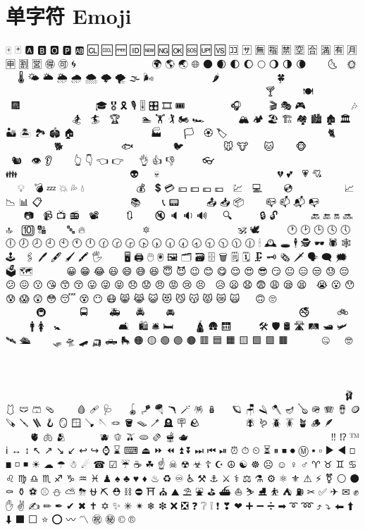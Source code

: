 \documentclass{article}
\begin{document}
\section{单字符 Emoji}

🀄 🃏 🅰 🅱 🅾 🅿 🆎 🆑 🆒 🆓 🆔 🆕 🆖 🆗 🆘 🆙 🆚 🈁 🈂 🈚 🈯 🈲 🈳 🈴 🈵 🈶 🈷 🈸 🈹 🈺 🉐 🉑 🌀 🌁 🌂 🌃 🌄 🌅 🌆 🌇 🌈 🌉 🌊 🌋 🌌 🌍 🌎 🌏 🌐 🌑 🌒 🌓 🌔 🌕 🌖 🌗 🌘 🌙 🌚 🌛 🌜 🌝 🌞 🌟 🌠 🌡 🌤 🌥 🌦 🌧 🌨 🌩 🌪 🌫 🌬 🌭 🌮 🌯 🌰 🌱 🌲 🌳 🌴 🌵 🌶 🌷 🌸 🌹 🌺 🌻 🌼 🌽 🌾 🌿 🍀 🍁 🍂 🍃 🍄 🍅 🍆 🍇 🍈 🍉 🍊 🍋 🍌 🍍 🍎 🍏 🍐 🍑 🍒 🍓 🍔 🍕 🍖 🍗 🍘 🍙 🍚 🍛 🍜 🍝 🍞 🍟 🍠 🍡 🍢 🍣 🍤 🍥 🍦 🍧 🍨 🍩 🍪 🍫 🍬 🍭 🍮 🍯 🍰 🍱 🍲 🍳 🍴 🍵 🍶 🍷 🍸 🍹 🍺 🍻 🍼 🍽 🍾 🍿 🎀 🎁 🎂 🎃 🎄 🎅 🎆 🎇 🎈 🎉 🎊 🎋 🎌 🎍 🎎 🎏 🎐 🎑 🎒 🎓 🎖 🎗 🎙 🎚 🎛 🎞 🎟 🎠 🎡 🎢 🎣 🎤 🎥 🎦 🎧 🎨 🎩 🎪 🎫 🎬 🎭 🎮 🎯 🎰 🎱 🎲 🎳 🎴 🎵 🎶 🎷 🎸 🎹 🎺 🎻 🎼 🎽 🎾 🎿 🏀 🏁 🏂 🏃 🏄 🏅 🏆 🏇 🏈 🏉 🏊 🏋 🏌 🏍 🏎 🏏 🏐 🏑 🏒 🏓 🏔 🏕 🏖 🏗 🏘 🏙 🏚 🏛 🏜 🏝 🏞 🏟 🏠 🏡 🏢 🏣 🏤 🏥 🏦 🏧 🏨 🏩 🏪 🏫 🏬 🏭 🏮 🏯 🏰 🏳 🏴 🏵 🏷 🏸 🏹 🏺 🏻 🏼 🏽 🏾 🏿 🐀 🐁 🐂 🐃 🐄 🐅 🐆 🐇 🐈 🐉 🐊 🐋 🐌 🐍 🐎 🐏 🐐 🐑 🐒 🐓 🐔 🐕 🐖 🐗 🐘 🐙 🐚 🐛 🐜 🐝 🐞 🐟 🐠 🐡 🐢 🐣 🐤 🐥 🐦 🐧 🐨 🐩 🐪 🐫 🐬 🐭 🐮 🐯 🐰 🐱 🐲 🐳 🐴 🐵 🐶 🐷 🐸 🐹 🐺 🐻 🐼 🐽 🐾 🐿 👀 👁 👂 👃 👄 👅 👆 👇 👈 👉 👊 👋 👌 👍 👎 👏 👐 👑 👒 👓 👔 👕 👖 👗 👘 👙 👚 👛 👜 👝 👞 👟 👠 👡 👢 👣 👤 👥 👦 👧 👨 👩 👪 👫 👬 👭 👮 👯 👰 👱 👲 👳 👴 👵 👶 👷 👸 👹 👺 👻 👼 👽 👾 👿 💀 💁 💂 💃 💄 💅 💆 💇 💈 💉 💊 💋 💌 💍 💎 💏 💐 💑 💒 💓 💔 💕 💖 💗 💘 💙 💚 💛 💜 💝 💞 💟 💠 💡 💢 💣 💤 💥 💦 💧 💨 💩 💪 💫 💬 💭 💮 💯 💰 💱 💲 💳 💴 💵 💶 💷 💸 💹 💺 💻 💼 💽 💾 💿 📀 📁 📂 📃 📄 📅 📆 📇 📈 📉 📊 📋 📌 📍 📎 📏 📐 📑 📒 📓 📔 📕 📖 📗 📘 📙 📚 📛 📜 📝 📞 📟 📠 📡 📢 📣 📤 📥 📦 📧 📨 📩 📪 📫 📬 📭 📮 📯 📰 📱 📲 📳 📴 📵 📶 📷 📸 📹 📺 📻 📼 📽 📿 🔀 🔁 🔂 🔃 🔄 🔅 🔆 🔇 🔈 🔉 🔊 🔋 🔌 🔍 🔎 🔏 🔐 🔑 🔒 🔓 🔔 🔕 🔖 🔗 🔘 🔙 🔚 🔛 🔜 🔝 🔞 🔟 🔠 🔡 🔢 🔣 🔤 🔥 🔦 🔧 🔨 🔩 🔪 🔫 🔬 🔭 🔮 🔯 🔰 🔱 🔲 🔳 🔴 🔵 🔶 🔷 🔸 🔹 🔺 🔻 🔼 🔽 🕉 🕊 🕋 🕌 🕍 🕎 🕐 🕑 🕒 🕓 🕔 🕕 🕖 🕗 🕘 🕙 🕚 🕛 🕜 🕝 🕞 🕟 🕠 🕡 🕢 🕣 🕤 🕥 🕦 🕧 🕯 🕰 🕳 🕴 🕵 🕶 🕷 🕸 🕹 🕺 🖇 🖊 🖋 🖌 🖍 🖐 🖕 🖖 🖤 🖥 🖨 🖱 🖲 🖼 🗂 🗃 🗄 🗑 🗒 🗓 🗜 🗝 🗞 🗡 🗣 🗨 🗯 🗳 🗺 🗻 🗼 🗽 🗾 🗿 😀 😁 😂 😃 😄 😅 😆 😇 😈 😉 😊 😋 😌 😍 😎 😏 😐 😑 😒 😓 😔 😕 😖 😗 😘 😙 😚 😛 😜 😝 😞 😟 😠 😡 😢 😣 😤 😥 😦 😧 😨 😩 😪 😫 😬 😭 😮 😯 😰 😱 😲 😳 😴 😵 😶 😷 😸 😹 😺 😻 😼 😽 😾 😿 🙀 🙁 🙂 🙃 🙄 🙅 🙆 🙇 🙈 🙉 🙊 🙋 🙌 🙍 🙎 🙏 🚀 🚁 🚂 🚃 🚄 🚅 🚆 🚇 🚈 🚉 🚊 🚋 🚌 🚍 🚎 🚏 🚐 🚑 🚒 🚓 🚔 🚕 🚖 🚗 🚘 🚙 🚚 🚛 🚜 🚝 🚞 🚟 🚠 🚡 🚢 🚣 🚤 🚥 🚦 🚧 🚨 🚩 🚪 🚫 🚬 🚭 🚮 🚯 🚰 🚱 🚲 🚳 🚴 🚵 🚶 🚷 🚸 🚹 🚺 🚻 🚼 🚽 🚾 🚿 🛀 🛁 🛂 🛃 🛄 🛅 🛋 🛌 🛍 🛎 🛏 🛐 🛑 🛒 🛕 🛖 🛗 🛜 🛝 🛞 🛟 🛠 🛡 🛢 🛣 🛤 🛥 🛩 🛫 🛬 🛰 🛳 🛴 🛵 🛶 🛷 🛸 🛹 🛺 🛻 🛼 🟠 🟡 🟢 🟣 🟤 🟥 🟦 🟧 🟨 🟩 🟪 🟫 🟰 🤌 🤍 🤎 🤏 🤐 🤑 🤒 🤓 🤔 🤕 🤖 🤗 🤘 🤙 🤚 🤛 🤜 🤝 🤞 🤟 🤠 🤡 🤢 🤣 🤤 🤥 🤦 🤧 🤨 🤩 🤪 🤫 🤬 🤭 🤮 🤯 🤰 🤱 🤲 🤳 🤴 🤵 🤶 🤷 🤸 🤹 🤺 🤼 🤽 🤾 🤿 🥀 🥁 🥂 🥃 🥄 🥅 🥇 🥈 🥉 🥊 🥋 🥌 🥍 🥎 🥏 🥐 🥑 🥒 🥓 🥔 🥕 🥖 🥗 🥘 🥙 🥚 🥛 🥜 🥝 🥞 🥟 🥠 🥡 🥢 🥣 🥤 🥥 🥦 🥧 🥨 🥩 🥪 🥫 🥬 🥭 🥮 🥯 🥰 🥱 🥲 🥳 🥴 🥵 🥶 🥷 🥸 🥹 🥺 🥻 🥼 🥽 🥾 🥿 🦀 🦁 🦂 🦃 🦄 🦅 🦆 🦇 🦈 🦉 🦊 🦋 🦌 🦍 🦎 🦏 🦐 🦑 🦒 🦓 🦔 🦕 🦖 🦗 🦘 🦙 🦚 🦛 🦜 🦝 🦞 🦟 🦠 🦡 🦢 🦣 🦤 🦥 🦦 🦧 🦨 🦩 🦪 🦫 🦬 🦭 🦮 🦯 🦰 🦱 🦲 🦳 🦴 🦵 🦶 🦷 🦸 🦹 🦺 🦻 🦼 🦽 🦾 🦿 🧀 🧁 🧂 🧃 🧄 🧅 🧆 🧇 🧈 🧉 🧊 🧋 🧌 🧍 🧎 🧏 🧐 🧑 🧒 🧓 🧔 🧕 🧖 🧗 🧘 🧙 🧚 🧛 🧜 🧝 🧞 🧟 🧠 🧡 🧢 🧣 🧤 🧥 🧦 🧧 🧨 🧩 🧪 🧫 🧬 🧭 🧮 🧯 🧰 🧱 🧲 🧳 🧴 🧵 🧶 🧷 🧸 🧹 🧺 🧻 🧼 🧽 🧾 🧿 🩰 🩱 🩲 🩳 🩴 🩵 🩶 🩷 🩸 🩹 🩺 🩻 🩼 🪀 🪁 🪂 🪃 🪄 🪅 🪆 🪇 🪈 🪐 🪑 🪒 🪓 🪔 🪕 🪖 🪗 🪘 🪙 🪚 🪛 🪜 🪝 🪞 🪟 🪠 🪡 🪢 🪣 🪤 🪥 🪦 🪧 🪨 🪩 🪪 🪫 🪬 🪭 🪮 🪯 🪰 🪱 🪲 🪳 🪴 🪵 🪶 🪷 🪸 🪹 🪺 🪻 🪼 🪽 🪿 🫀 🫁 🫂 🫃 🫄 🫅 🫎 🫏 🫐 🫑 🫒 🫓 🫔 🫕 🫖 🫗 🫘 🫙 🫚 🫛 🫠 🫡 🫢 🫣 🫤 🫥 🫦 🫧 🫨 🫰 🫱 🫲 🫳 🫴 🫵 🫶 🫷 🫸 ‼ ⁉ ™ ℹ ↔ ↕ ↖ ↗ ↘ ↙ ↩ ↪ ⌚ ⌛ ⌨ ⏏ ⏩ ⏪ ⏫ ⏬ ⏭ ⏮ ⏯ ⏰ ⏱ ⏲ ⏳ ⏸ ⏹ ⏺ Ⓜ ▪ ▫ ▶ ◀ ◻ ◼ ◽ ◾ ☀ ☁ ☂ ☃ ☄ ☎ ☑ ☔ ☕ ☘ ☝ ☠ ☢ ☣ ☦ ☪ ☮ ☯ ☸ ☹ ☺ ♀ ♂ ♈ ♉ ♊ ♋ ♌ ♍ ♎ ♏ ♐ ♑ ♒ ♓ ♟ ♠ ♣ ♥ ♦ ♨ ♻ ♾ ♿ ⚒ ⚓ ⚔ ⚕ ⚖ ⚗ ⚙ ⚛ ⚜ ⚠ ⚡ ⚧ ⚪ ⚫ ⚰ ⚱ ⚽ ⚾ ⛄ ⛅ ⛈ ⛎ ⛏ ⛑ ⛓ ⛔ ⛩ ⛪ ⛰ ⛱ ⛲ ⛳ ⛴ ⛵ ⛷ ⛸ ⛹ ⛺ ⛽ ✂ ✅ ✈ ✉ ✊ ✋ ✌ ✍ ✏ ✒ ✔ ✖ ✝ ✡ ✨ ✳ ✴ ❄ ❇ ❌ ❎ ❓ ❔ ❕ ❗ ❣ ❤ ➕ ➖ ➗ ➡ ➰ ➿ ⤴ ⤵ ⬅ ⬆ ⬇ ⬛ ⬜ ⭐ ⭕ 〰 〽 ㊗ ㊙ © ®
\end{document}
